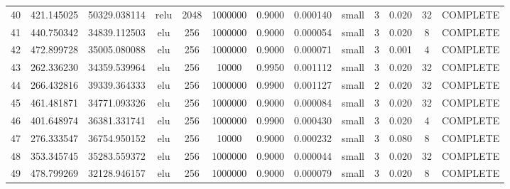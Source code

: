 \begin{longtable}{ccccccccccccc}
                       40 &                 421.145025 &                       50329.038114 &            relu &        2048 &      1000000 & 0.9000 &       0.000140 &     small &             3 & 0.020 &          32 & COMPLETE \\
                       41 &                 440.750342 &                       34839.112503 &             elu &         256 &      1000000 & 0.9000 &       0.000054 &     small &             3 & 0.020 &           8 & COMPLETE \\
                       42 &                 472.899728 &                       35005.080088 &             elu &         256 &      1000000 & 0.9000 &       0.000071 &     small &             3 & 0.001 &           4 & COMPLETE \\
                       43 &                 262.336230 &                       34359.539964 &             elu &         256 &        10000 & 0.9950 &       0.001112 &     small &             3 & 0.020 &          32 & COMPLETE \\
                       44 &                 266.432816 &                       39339.364333 &             elu &         256 &      1000000 & 0.9900 &       0.001127 &     small &             2 & 0.020 &          32 & COMPLETE \\
                       45 &                 461.481871 &                       34771.093326 &             elu &         256 &      1000000 & 0.9000 &       0.000084 &     small &             3 & 0.020 &          32 & COMPLETE \\
                       46 &                 401.648974 &                       36381.331741 &             elu &         256 &      1000000 & 0.9900 &       0.000430 &     small &             3 & 0.020 &           4 & COMPLETE \\
                       47 &                 276.333547 &                       36754.950152 &             elu &         256 &        10000 & 0.9000 &       0.000232 &     small &             3 & 0.080 &           8 & COMPLETE \\
                       48 &                 353.345745 &                       35283.559372 &             elu &         256 &      1000000 & 0.9000 &       0.000044 &     small &             3 & 0.020 &          32 & COMPLETE \\
                       49 &                 478.799269 &                       32128.946157 &             elu &         256 &      1000000 & 0.9000 &       0.000079 &     small &             3 & 0.020 &           8 & COMPLETE \\
\end{longtable}
